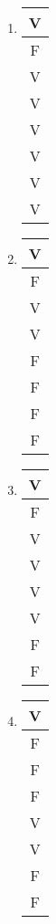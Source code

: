 \begin{enumerate}
  \begin{multicols}{5}
  \begin{enumerate}
  \item
  \begin{table}[H]
 \begin{tabular}{|c|} \hline
 V   \\ \hline
 F  \\ \hline
 V   \\ \hline
 V   \\ \hline
 V   \\ \hline
 V   \\ \hline
 V  \\ \hline
 V   \\ \hline
 \end{tabular}
 \end{table}

  \item
  \begin{table}[H]
 \begin{tabular}{|c|} \hline
 V   \\ \hline
 F  \\ \hline
 V   \\ \hline
 V   \\ \hline
 F   \\ \hline
 F   \\ \hline
 F  \\ \hline
 F   \\ \hline
 \end{tabular}
 \end{table}

  \item
  \begin{table}[H]
 \begin{tabular}{|c|} \hline
 V   \\ \hline
 F  \\ \hline
 V   \\ \hline
 V   \\ \hline
 V   \\ \hline
 V   \\ \hline
 F  \\ \hline
 F   \\ \hline
 \end{tabular}
 \end{table}

  \item
  \begin{table}[H]
 \begin{tabular}{|c|} \hline
 V   \\ \hline
 F  \\ \hline
 F   \\ \hline
 F   \\ \hline
 V   \\ \hline
 V   \\ \hline
 F  \\ \hline
 F   \\ \hline
 \end{tabular}
 \end{table}


\end{enumerate}
\end{multicols}
\end{enumerate}
